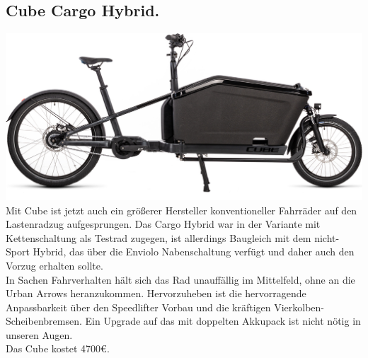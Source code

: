 \documentclass[a4paper,ngerman, 14pt] {scrartcl}
\begin{document}
\subsection{Cube Cargo Hybrid.}
\includegraphics[scale=0.36]{cube_cargo_hybrid.jpg}\\
Mit Cube ist jetzt auch ein größerer Hersteller konventioneller Fahrräder auf den Lastenradzug aufgesprungen. Das Cargo Hybrid war in der  Variante mit Kettenschaltung als Testrad zugegen, ist allerdings Baugleich mit dem nicht-Sport Hybrid, das über die Enviolo Nabenschaltung verfügt und daher auch den Vorzug erhalten sollte.\\
In Sachen Fahrverhalten hält sich das Rad unauffällig im Mittelfeld, ohne an die Urban Arrows heranzukommen. Hervorzuheben ist die hervorragende Anpassbarkeit über den Speedlifter Vorbau und die kräftigen Vierkolben-Scheibenbremsen. Ein Upgrade auf das  mit doppelten Akkupack ist nicht nötig in unseren Augen.\\
Das Cube kostet 4700€.
\end{document}
